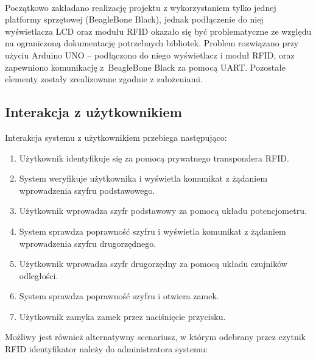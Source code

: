 \documentclass[polish,polish,a4paper]{article}
\begin{document}
	\\
	Początkowo zakładano realizację projektu z wykorzystaniem tylko jednej platformy sprzętowej (BeagleBone Black), jednak podłączenie do niej wyświetlacza LCD oraz modułu RFID okazało się być problematyczne ze względu na ograniczoną dokumentację potrzebnych bibliotek. Problem rozwiązano przy użyciu Arduino UNO – podłączono do niego wyświetlacz i moduł RFID, oraz zapewniono komunikację z~BeagleBone Black za pomocą UART. Pozostałe elementy zostały zrealizowane zgodnie z założeniami.
	
	\subsection{Interakcja z użytkownikiem}
	\label{scenario}
	Interakcja systemu z użytkownikiem przebiega następująco:
	\begin{enumerate}
		\setlength\itemsep{-0.2em}
		\item Użytkownik identyfikuje się za pomocą prywatnego transpondera RFID.
		\item System weryfikuje użytkownika i wyświetla komunikat z żądaniem wprowadzenia szyfru podstawowego.
		\item Użytkownik wprowadza szyfr podstawowy za pomocą układu potencjometru.
		\item System sprawdza poprawność szyfru i wyświetla komunikat z żądaniem wprowadzenia szyfru drugorzędnego.
		\item Użytkownik wprowadza szyfr drugorzędny za pomocą układu czujników odległości.
		\item System sprawdza poprawność szyfru i otwiera zamek.
		\item Użytkownik zamyka zamek przez naciśnięcie przycisku.
	\end{enumerate}
	Możliwy jest również alternatywny scenariusz, w którym odebrany przez czytnik RFID identyfikator należy do administratora systemu:
\end{document}
